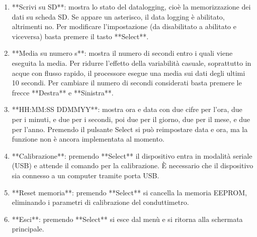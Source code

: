 \documentclass[]{article}
\begin{document}
\begin{enumerate}
\item { **Scrivi su SD**: mostra lo stato del datalogging, cioè la memorizzazione dei dati su scheda SD. Se appare un asterisco, il data logging è abilitato, altrimenti no. Per modificare l'impostazione (da disabilitato a abilitato e viceversa) basta premere il tasto **Select**.}
\item { **Media su numero s**: mostra il numero di secondi entro i quali viene eseguita la media. Per ridurre l'effetto della variabilità casuale, soprattutto in acque con flusso rapido, il processore esegue una media sui dati degli ultimi 10 secondi. Per cambiare il numero di secondi considerati basta premere le frecce **Destra** e **Sinistra**.}
\item { **HH:MM:SS DDMMYY**: mostra ora e data con due cifre per l'ora, due per i minuti, e due per i secondi, poi due per il giorno, due per il mese, e due per l'anno. Premendo il pulsante Select si può reimpostare data e ora, ma la funzione non è ancora implementata al momento.}
\item { **Calibrazione**: premendo **Select** il dispositivo entra in modalità seriale (USB) e attende il comando per la calibrazione. È necessario che il dispositivo sia connesso a un computer tramite porta USB.}
\item { **Reset memoria**: premendo **Select** si cancella la memoria EEPROM, eliminando i parametri di calibrazione del conduttimetro.}
\item { **Esci**: premendo **Select** si esce dal menù e si ritorna alla schermata principale.}
\end{enumerate}
\end{document}
